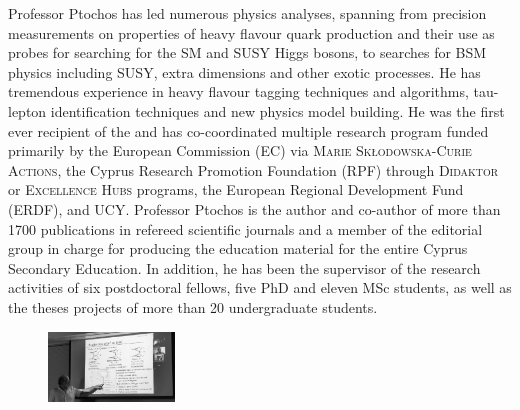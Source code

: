 \begin{multimuons-2}[enhanced, tikz={rotate=0}]{}
\begin{multicols*}{3}
    Professor Ptochos has led numerous physics analyses, spanning
    from precision measurements on properties of heavy flavour quark
    production and their use as probes for searching for the SM and SUSY
    Higgs bosons, to searches for BSM physics including SUSY, extra
    dimensions and other exotic processes. He has tremendous experience in
    heavy flavour tagging techniques and algorithms, tau-lepton
    identification techniques and new physics model building. 
    He was the first ever recipient of the  and has co-coordinated multiple research program
    funded primarily by the European Commission (EC) via \textsc{Marie
    Skłodowska-Curie Actions},  the Cyprus Research Promotion
    Foundation (RPF) through \textsc{Didaktor} or \textsc{Excellence
      Hubs} programs, the European Regional Development Fund (ERDF), and
    UCY. Professor Ptochos is the author and co-author of more than 
    1700 publications in refereed scientific journals and a member of the
    editorial group in charge for producing the education material
    for the entire Cyprus Secondary Education. In addition, he has
    been the supervisor of the research activities of six postdoctoral
    fellows, five PhD and eleven MSc students, as well as the theses
    projects of more than 20 undergraduate students. 

    \begin{figure}
      \begin{center}
        \leavevmode
        \includegraphics[width=0.3\textwidth]{./figures/Fotis7.png}
      \end{center}
    \end{figure}
    \columnbreak
    

\end{multicols*}
\end{multimuons-2}
